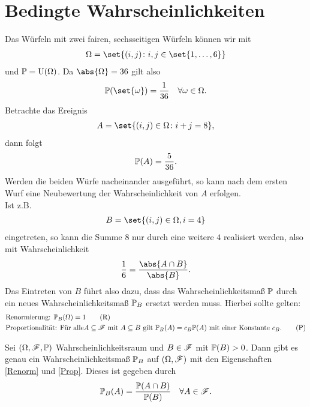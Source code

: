 ﻿\section{Bedingte Wahrscheinlichkeiten}
\begin{example}
	Das Würfeln mit zwei fairen, sechsseitigen Würfeln können wir mit 
	\begin{align}
		\O = \set{(i,j) \colon i,j \in \set{1,\dots,6}}\notag
	\end{align}
	und $\P = \Gleich(\O)$. Da $\abs{\O} = 36$ gilt also
	\begin{align}
		\P(\set{\omega}) = \frac{1}{36} \quad \forall \omega \in \O.\notag
	\end{align}
	Betrachte das Ereignis
	\begin{align}
		A = \set{(i,j) \in \O \colon i + j = 8},\notag
	\end{align}
	dann folgt
	\begin{align}
		\P(A) = \frac{5}{36}.\notag
	\end{align}
	Werden die beiden Würfe nacheinander ausgeführt, so kann nach dem ersten Wurf eine Neubewertung der Wahrscheinlichkeit von $A$ erfolgen.\\
	Ist z.B.
	\begin{align}
		B = \set{(i,j) \in \O, i = 4}\notag
	\end{align}
	eingetreten, so kann die Summe $8$ nur durch eine weitere $4$ realisiert werden, also mit Wahrscheinlichkeit
	\begin{align}
		\frac{1}{6} = \frac{\abs{A \cap B}}{\abs{B}}.\notag 
	\end{align}
	Das Eintreten von $B$ führt also dazu, dass das Wahrscheinlichkeitsmaß $\P$ durch ein neues Wahrscheinlichkeitsmaß $\P_{B}$ ersetzt werden muss. Hierbei sollte gelten:
	\begin{align}
		 &\text{Renormierung: }\P_{B}(\O) = 1\label{Renorm}\tag{R}\\
		 &\text{Proportionalität: Für alle} A \subseteq \F \mit A \subseteq B \text{ gilt }
		 \P_{B}(A) = c_B \P(A) \text{ mit einer Konstante } c_B.\label{Prop}\tag{P}
    \end{align}
\end{example}

\begin{lemma}
	Sei $(\O, \F, \P)$ Wahrscheinlichkeitsraum und $B \in \F$ mit $\P(B) > 0$. Dann gibt es genau ein Wahrscheinlichkeitsmaß $\P_B$ auf $(\O, \F)$ mit den Eigenschaften \eqref{Renorm} und \eqref{Prop}. Dieses ist gegeben durch
	\begin{align}
		\P_{B}(A) = \frac{\P(A\cap B)}{\P(B)} \quad \forall A \in \F.\notag
	\end{align}
\end{lemma}

